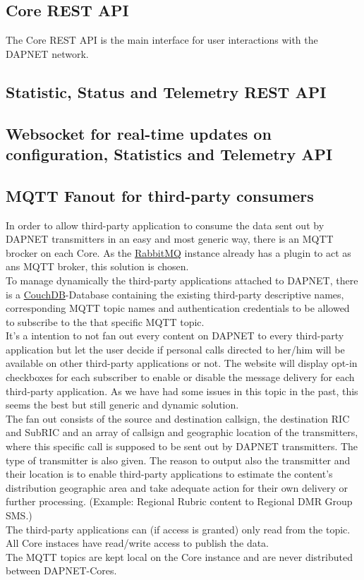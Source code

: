\subsection{Core REST API}
\label{dapnetdef:corerestapi}
The Core REST API is the main interface for user interactions with the DAPNET network.

\subsection{Statistic, Status and Telemetry REST API}
\label{dapnetdef:statisticstatustelemetry}


\subsection{Websocket for real-time updates on configuration, Statistics and Telemetry API}
\label{dapnetdef:websocket}

\subsection{MQTT Fanout for third-party consumers}
\label{dapnetdef:mqttfanout}
In order to allow third-party application to consume the data sent out by DAPNET transmitters in an easy and most generic way, there is an MQTT brocker on each Core. As the \hyperref[dapnetdef:clusterdesc:rabbitmq]{RabbitMQ} instance already has a plugin to act as ans MQTT broker, this solution is chosen.\\
To manage dynamically the third-party applications attached to DAPNET, there is a \hyperref[dapnetdef:clusterdesc:couchdb]{CouchDB}-Database containing the existing third-party descriptive names, corresponding MQTT topic names and authentication credentials to be allowed to subscribe to the that specific MQTT topic.\\
It's a intention to not fan out every content on DAPNET to every third-party application but let the user decide if personal calls directed to her/him will be available on other third-party applications or not. The website will display opt-in checkboxes for each subscriber to enable or disable the message delivery for each third-party application. As we have had some issues in this topic in the past, this seems the best but still generic and dynamic solution.\\
The fan out consists of the source and destination callsign, the destination RIC and SubRIC and an array of callsign and geographic location of the transmitters, where this specific call is supposed to be sent out by DAPNET transmitters. The type of transmitter is also given. The reason to output also the transmitter and their location is to enable third-party applications to estimate the content's distribution geographic area and take adequate action for their own delivery or further processing. (Example: Regional Rubric content to Regional DMR Group SMS.)\\
The third-party applications can (if access is granted) only read from the topic. All Core instaces have read/write access to publish the data.\\
The MQTT topics are kept local on the Core instance and are never distributed between DAPNET-Cores.

